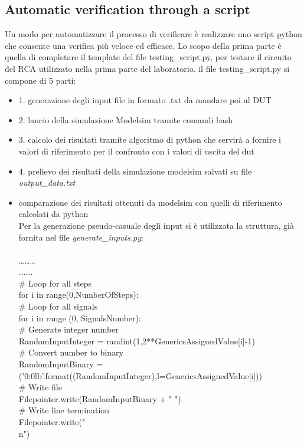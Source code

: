 \subsection{Automatic verification through a script}
Un modo per automatizzare il processo di verificare è realizzare uno script python che consente una verifica più veloce ed efficace. Lo scopo della prima parte è quella di completare il template del file testing\_script.py, per testare il circuito del RCA utilizzato nella prima parte del laboratorio.
il file testing\_script.py  si compone di 5 parti:
\begin{itemize}
	\item{1. generazione degli input file in formato .txt da mandare poi al DUT}
	\item{2. lancio della simulazione Modelsim tramite comandi bash}
	\item{3. calcolo dei risultati tramite algoritmo di python che servirà a fornire i valori di riferimento per il confronto con i valori  di uscita del dut}
	\item{4. prelievo dei risultati della simulazione modelsim salvati su file \textit{output\_data.txt}}
	\item{comparazione dei risultati ottenuti da modelsim con quelli di riferimento calcolati da python}
\\
Per la generazione pseudo-casuale degli input si è utilizzata la struttura, già fornita nel file \textit{generate\_inputs.py}:\\
\\
………\\
......\\
# Loop for all steps\\
for i in range(0,NumberOfSteps):\\
# Loop for all signals\\
for i in range (0, SignalsNumber):\\
# Generate integer number\\
RandomInputInteger = randint(1,2**GenericsAssignedValue[i]-1)\\
# Convert number to binary\\
RandomInputBinary = ('{0:0{l}b}'.format((RandomInputInteger),l=GenericsAssignedValue[i]))\\
# Write file\\
Filepointer.write(RandomInputBinary + " ")\\
# Write line termination\\
Filepointer.write("\\n")\\

\end{itemize}
